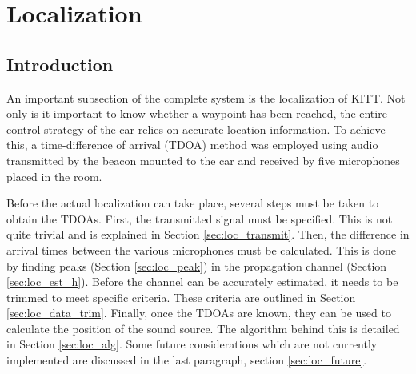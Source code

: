 \documentclass[11pt,titlepage]{report}
\begin{document}
\chapter{Localization}
\label{ch:localization}
\section{Introduction}
An important subsection of the complete system is the localization of KITT. Not only is it important to know whether a waypoint has been reached, the entire control strategy of the car relies on accurate location information. To achieve this, a time-difference of arrival (TDOA) method was employed using audio transmitted by the beacon mounted to the car and received by five microphones placed in the room.

Before the actual localization can take place, several steps must be taken to obtain the TDOAs. First, the transmitted signal must be specified. This is not quite trivial and is explained in Section \ref{sec:loc_transmit}. Then, the difference in arrival times between the various microphones must be calculated. This is done by finding peaks (Section \ref{sec:loc_peak}) in the propagation channel (Section \ref{sec:loc_est_h}). Before the channel can be accurately estimated, it needs to be trimmed to meet specific criteria. These criteria are outlined in Section \ref{sec:loc_data_trim}. Finally, once the TDOAs are known, they can be used to calculate the position of the sound source. The algorithm behind this is detailed in Section \ref{sec:loc_alg}. Some future considerations which are not currently implemented are discussed in the last paragraph, section \ref{sec:loc_future}.
\end{document}
